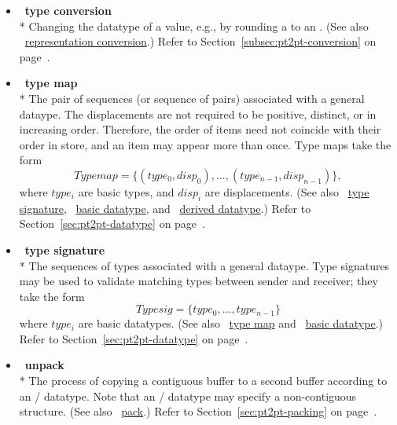 \begin{itemize}
\label{glossary:type_conversion}
\item  ~\hypertarget{glossary:type_conversion}{\textbf{type conversion}} \\*
Changing the datatype of a value, e.g., by rounding a
 to an .  
(See also ~\hyperlink{glossary:representation_conversion}{representation conversion}.)
Refer to Section~\ref{subsec:pt2pt-conversion} on page~\pageref{subsec:pt2pt-conversion}.


\label{glossary:type_map}
\item  ~\hypertarget{glossary:type_map}{\textbf{type map}} \\*
The pair of sequences (or sequence of pairs) associated with a general dataype.
The displacements are not required to be positive, distinct, or
in increasing order. Therefore, the order of items need not
coincide with their order in store, and an item may appear more than
once. Type maps take the form
\[
Typemap = \{ (type_0,disp_0), ..., (type_{n-1}, disp_{n-1}) \} ,
\]
where $type_i$ are basic types, and
$disp_i$ are  displacements.
(See also ~\hyperlink{glossary:type_signature}{type signature},
~\hyperlink{glossary:basic_datatype}{basic datatype},
and ~\hyperlink{glossary:derived_datatype}{derived datatype}.)
Refer to Section~\ref{sec:pt2pt-datatype} on page~\pageref{sec:pt2pt-datatype}.

\label{glossary:type_signature}
\item  ~\hypertarget{glossary:type_signature}{\textbf{type signature}} \\*
The sequences of types associated with a general dataype.
Type signatures may be used to validate matching types between sender and receiver; they take the form
\[
Typesig = \{ type_0 , ... , type_{n-1} \}
\]
where $type_i$ are basic datatypes.
(See also ~\hyperlink{glossary:type_map}{type map} and ~\hyperlink{glossary:basic_datatype}{basic datatype}.)
Refer to Section~\ref{sec:pt2pt-datatype} on page~\pageref{sec:pt2pt-datatype}.

\label{glossary:unpack}
\item  ~\hypertarget{glossary:unpack}{\textbf{unpack}} \\*
The process of copying a contiguous buffer to a second buffer according to an \MPI/ datatype.
Note that an \MPI/ datatype may specify a non-contiguous structure.
(See also ~\hyperlink{glossary:pack}{pack}.)
Refer to Section~\ref{sec:pt2pt-packing} on page~\pageref{sec:pt2pt-packing}.


\end{itemize}
